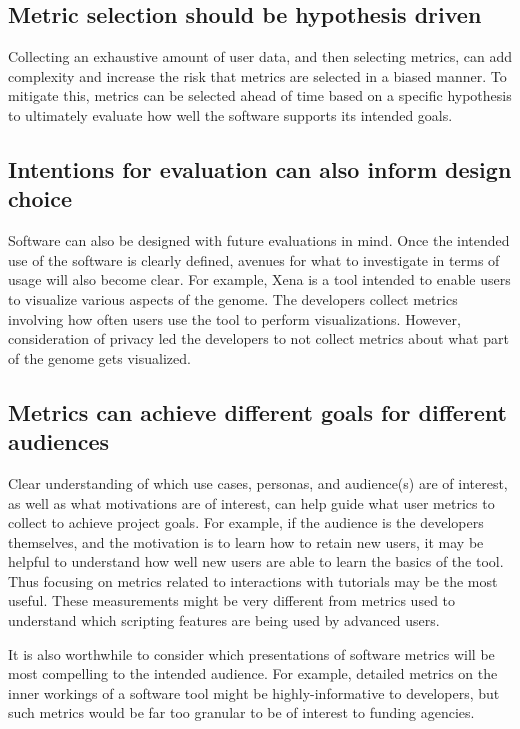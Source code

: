 \documentclass{article}
\begin{document}
\subsection{Metric selection should be hypothesis driven} 
\label{sec:hypothesis_driven}
Collecting an exhaustive amount of user data, and then selecting metrics, can add complexity and increase the risk that metrics are selected in a biased manner. To mitigate this, metrics can be selected ahead of time based on a specific hypothesis to ultimately evaluate how well the software supports its intended goals. 


\subsection{Intentions for evaluation can also inform design choice} Software can also be designed with future evaluations in mind. Once the intended use of the software is clearly defined, avenues for what to investigate in terms of usage will also become clear. For example, Xena \cite{xena_2020} is a tool intended to enable users to visualize various aspects of the genome. The developers collect metrics involving how often users use the tool to perform  visualizations. However, consideration of privacy led the developers to not collect metrics about what part of the genome gets visualized. 




\subsection{Metrics can achieve different goals for different audiences}

Clear understanding of which use cases, personas, and audience(s) are of interest, as well as what motivations are of interest, can help guide what user metrics to collect to achieve project goals.  For example, if the audience is the developers themselves, and the motivation is to learn how to retain new users, it may be helpful to understand how well new users are able to learn the basics of the tool. Thus focusing on metrics related to interactions with tutorials may be the most useful. These measurements might be very different from metrics used to understand which scripting features are being used by advanced users. 

It is also worthwhile to consider which presentations of software metrics will be most compelling to the intended audience. For example, detailed metrics on the inner workings of a software tool might be highly-informative to developers, but such metrics would be far too granular to be of interest to funding agencies. 
\end{document}
